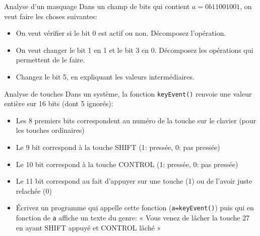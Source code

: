 \begin{exercice}
  \begin{exercicelet}{Analyse d'un masquage}
    Dans un champ de bits qui contient $a=0b11001001$, on veut faire les
    choses suivantes:
    \begin{itemize}
    \item On veut vérifier si le bit 0 est actif ou non. Décomposez
      l'opération.
    \item On veut changer le bit 1 en 1 et le bit 3 en 0. Décomposez les
      opérations qui permettent de le faire.
    \item Changez le bit 5, en expliquant les valeurs intermédiaires.
    \end{itemize}
  \end{exercicelet}
  \begin{exercicelet}{Analyse de touches}
    Dans un système, la fonction \texttt{keyEvent()} renvoie une valeur
    entière sur 16 bits (dont 5 ignorés):
    \begin{itemize}
    \item Les 8 premiers bits correspondent au numéro de la touche sur le
      clavier (pour les touches ordinaires)
    \item Le 9\ieme{} bit correspond à la touche SHIFT (1: pressée, 0: pas
      pressée)
    \item Le 10\ieme{} bit correspond à la touche CONTROL (1: pressée, 0: pas
      pressée)
    \item Le 11\ieme{} bit correspond au fait d'appuyer sur une touche (1) ou
      de l'avoir juste relachée (0)
    \end{itemize}
    \begin{itemize}
    \item[\ddialoghome] Écrivez un programme qui appelle cette fonction
      (\texttt{a=keyEvent()}) puis qui en fonction de \texttt{a} affiche un
      texte du genre: « Vous venez de lâcher la touche 27 en ayant SHIFT
      appuyé et CONTROL lâché »
    \end{itemize}
  \end{exercicelet}
\end{exercice}
